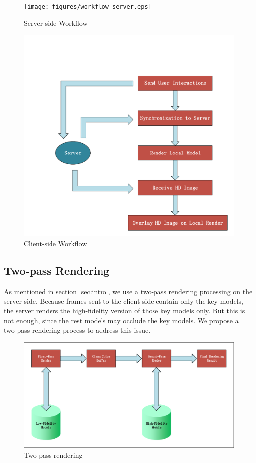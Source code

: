 \begin{figure}[!htbp]
	\centering
	\texttt{[image: figures/workflow\_server.eps]}
	\caption{Server-side Workflow}
	\label{fig:s-wf}
\end{figure}

\begin{figure}[!htbp]
	\centering
	\includegraphics[width=0.7\columnwidth]{figures/workflow_client.pdf}
	\caption{Client-side Workflow}
	\label{fig:c-wf}
\end{figure}

\subsection{Two-pass Rendering}

As mentioned in section \ref{sec:intro}, we use a two-pass rendering processing on the server side.
Because frames sent to the client side contain only the key models, the server renders the high-fidelity version of those key models only.
But this is not enough, since the rest models may occlude the key models.
We propose a two-pass rendering process to address this issue.

\begin{figure}[!htbp]
	\centering
	\includegraphics[width=0.7\columnwidth]{figures/two-pass-rendering.pdf}
	\caption{Two-pass rendering}
	\label{fig:tp-rendering}
\end{figure}

